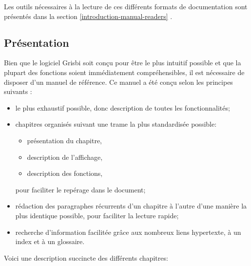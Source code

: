 Les outils nécessaires à la lecture de ces différents formats de documentation sont présentés dans la section \vref{introduction-manual-readers} .


\subsection{Présentation\label{introduction-manual-presentation}}

Bien que le logiciel Grisbi soit conçu pour être le plus intuitif possible et que la plupart des fonctions soient immédiatement compréhensibles, il est nécessaire de disposer d'un manuel de référence. Ce manuel a été conçu selon les principes suivants :

\begin{itemize} 
	\item le plus exhaustif possible, donc description de toutes les fonctionnalités;
	\item chapitres organisés suivant une trame la plus standardisée possible:
		\begin{itemize}
		\item présentation du chapitre,
		\item description de l'affichage,
		\item description des fonctions,
		\end{itemize}
	pour faciliter le repérage dans le document;
	\item rédaction des paragraphes récurrents d'un chapitre à l'autre d'une manière la plus identique possible, pour faciliter la lecture rapide;
	\item recherche d'information facilitée grâce aux nombreux \gls{liens hypertexte}, à un index et à un glossaire.
\end{itemize}

Voici une description succincte des différents chapitres:

